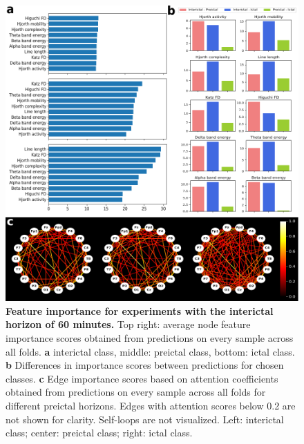 \documentclass[a4paper,fleqn]{cas-sc}
\begin{document}
\begin{figure}[h]
    \centering
    \includegraphics[width=\linewidth]{figures/lookback_3600.pdf}
    \caption{\textbf{Feature importance for experiments with the interictal horizon of 60 minutes.} Top right: average node feature importance scores obtained from predictions on every sample across all folds. \textbf{a} interictal class, middle: preictal class, bottom: ictal class. \textbf{b} Differences in importance scores between predictions for chosen classes. \textbf{c} Edge importance scores based on attention coefficients obtained from predictions on every sample across all folds for different preictal horizons. Edges with attention scores below 0.2 are not shown for clarity. Self-loops are not visualized. Left: interictal class; center: preictal class; right: ictal class.}
    \label{figs7:lookback_3600}
\end{figure}

\clearpage


% 


\end{document}
